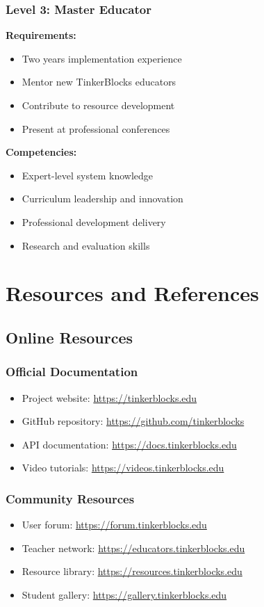 \subsubsection{Level 3: Master Educator}

\textbf{Requirements:}
\begin{itemize}
    \item Two years implementation experience
    \item Mentor new TinkerBlocks educators
    \item Contribute to resource development
    \item Present at professional conferences
\end{itemize}

\textbf{Competencies:}
\begin{itemize}
    \item Expert-level system knowledge
    \item Curriculum leadership and innovation
    \item Professional development delivery
    \item Research and evaluation skills
\end{itemize}

\section{Resources and References}

\subsection{Online Resources}

\subsubsection{Official Documentation}
\begin{itemize}
    \item Project website: \url{https://tinkerblocks.edu}
    \item GitHub repository: \url{https://github.com/tinkerblocks}
    \item API documentation: \url{https://docs.tinkerblocks.edu}
    \item Video tutorials: \url{https://videos.tinkerblocks.edu}
\end{itemize}

\subsubsection{Community Resources}
\begin{itemize}
    \item User forum: \url{https://forum.tinkerblocks.edu}
    \item Teacher network: \url{https://educators.tinkerblocks.edu}
    \item Resource library: \url{https://resources.tinkerblocks.edu}
    \item Student gallery: \url{https://gallery.tinkerblocks.edu}
\end{itemize}

